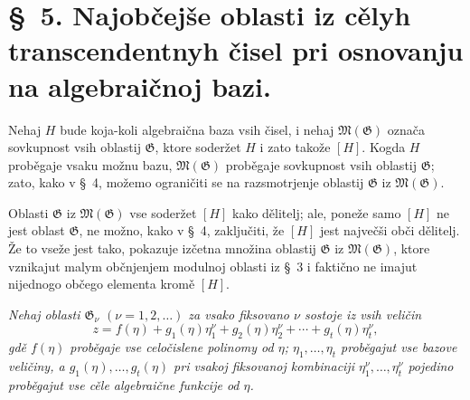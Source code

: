 \documentclass[11pt]{article}
\begin{document}
\section*{\S\ 5. Najobčejše oblasti iz cělyh transcendentnyh čisel pri osnovanju na algebraičnoj bazi.}

Nehaj $H$ bude koja-koli algebraična baza vsih čisel, i nehaj
$\mathfrak M(\mathfrak G)$ označa sovkupnost vsih oblastij $\mathfrak G$, ktore
soderžet $H$ i zato takože $[H]$. Kogda $H$ proběgaje vsaku možnu bazu,
$\mathfrak M(\mathfrak G)$ proběgaje sovkupnost vsih oblastij $\mathfrak G$;
zato, kako v \S\ 4, možemo ograničiti se na razsmotrjenje oblastij
$\mathfrak G$ iz $\mathfrak M(\mathfrak G)$.

Oblasti $\mathfrak G$ iz $\mathfrak M(\mathfrak G)$ vse soderžet $[H]$ kako
dělitelj; ale, poneže samo $[H]$ ne jest oblast $\mathfrak G$, ne možno, kako v
\S\ 4, zaključiti, že $[H]$ jest največši obči dělitelj. Že to vseže jest tako,
pokazuje izčetna množina oblastij $\mathfrak G$ iz $\mathfrak M(\mathfrak G)$,
ktore vznikajut malym občnjenjem modulnoj oblasti iz \S\ 3 i faktično ne imajut
nijednogo občego elementa kromě $[H]$.

{\itshape Nehaj oblasti $\mathfrak G_\nu$ $(\nu=1,2,\ldots)$ za vsako fiksovano
$\nu$ sostoje iz vsih veličin}
\begin{equation}
z=f(\eta)+g_1(\eta)\eta_1^\nu+g_2(\eta)\eta_2^\nu+\cdots+g_t(\eta)\eta_t^\nu,
\tag{1}
\end{equation}
{\itshape gdě $f(\eta)$ proběgaje vse celočislene polinomy od $\eta$;
$\eta_1,\ldots,\eta_t$ proběgajut vse bazove veličiny, a
$g_1(\eta),\ldots,g_t(\eta)$ pri vsakoj fiksovanoj kombinaciji
$\eta_1^\nu,\ldots,\eta_t^\nu$ pojedino proběgajut vse cěle algebraične funkcije
od $\eta$.}
\end{document}
